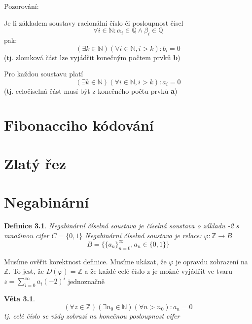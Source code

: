 \documentclass[12pt]{book}
\newtheorem{definice}{Definice}
\newtheorem{veta}{Věta}
\begin{document}
\newpage
Pozorování:


Je li základem soustavy racionální číslo či posloupnost čísel
$$\forall i \in \mathbb{N} : \alpha_i \in \mathbb{Q} \land \beta_i \in \mathbb{Q}$$
pak:
$$ (\exists k \in \mathbb{N} )(\forall i \in \mathbb{N}, i>k): b_i = 0 $$
(tj. zlomková část lze vyjádřit konečným počtem prvků \textbf{b})\newline \newline

Pro každou soustavu platí
$$ (\exists k \in \mathbb{N} )(\forall i \in \mathbb{N}, i>k): a_i = 0 $$
(tj. celočíselná část musí být  z konečného počtu prvků \textbf{a})


\chapter{Fibonacciho kódování}


\chapter{Zlatý řez}


\chapter{Negabinární}

\begin{definice}
	Negabinární číselná soustava je číselná soustava o základu -2 s množinou cifer $C=\{0,1\}$\newline
	Negabinární číselná soustava je relace:
	$\varphi:\mathbb{Z}\to B$
	 $$B=\{\{a_n\}_{n=0}^\infty,a_n \in \{0,1\} \}$$
\end{definice}
Musíme ověřit korektnost definice. Musíme ukázat, že $\varphi$ je opravdu zobrazení na $\mathbb{Z}$. To jest, že $D(\varphi)=\mathbb{Z}$ a že každé celé číslo z je možné vyjádřit ve tvaru $z=\sum_{i=0}^\infty a_i(-2)^i$ jednoznačně

\begin{veta}
	$$(\forall z \in \mathbb{Z})(\exists n_0 \in \mathbb{N}) (\forall n > n_0) : a_n = 0$$tj. celé číslo se vždy zobrazí na konečnou posloupnost cifer
	\end{veta}
\end{document}
